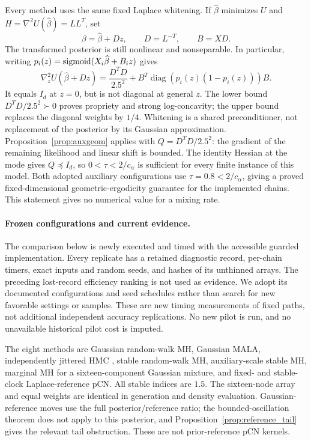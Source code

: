 \documentclass[pdflatex,iicol,sn-mathphys-ay]{sn-jnl}
\theoremstyle{definition}\newtheorem{definition}[theorem]{Definition}
\theoremstyle{remark}\newtheorem{remark}[theorem]{Remark}
\numberwithin{equation}{section}
\newcommand{\diag}{\operatorname{diag}}\newcommand{\SA}{\mathrm{S}\alpha\mathrm{S}}
\newcommand{\1}{\mathbf 1}
\begin{document}
Every method uses the same fixed Laplace whitening. If $\widehat\beta$ minimizes $U$ and $H=\nabla^2U(\widehat\beta)=LL^T$, set
\[
 \beta=\widehat\beta+Dz,\qquad D=L^{-T},\qquad B=XD.
\]
The transformed posterior is still nonlinear and nonseparable. In particular, writing $p_i(z)=\operatorname{sigmoid}(X_i\widehat\beta+B_iz)$ gives
\begin{equation}
 \nabla_z^2U(\widehat\beta+Dz)
 =\frac{D^TD}{2.5^2}+B^T\diag(p_i(z)(1-p_i(z)))B.
 \label{eq:logistichessian}
\end{equation}
It equals $I_d$ at $z=0$, but is not diagonal at general $z$. The lower bound $D^TD/2.5^2\succ0$ proves propriety and strong log-concavity; the upper bound replaces the diagonal weights by $1/4$. Whitening is a shared preconditioner, not replacement of the posterior by its Gaussian approximation. Proposition~\ref{prop:auxgeom} applies with $Q=D^TD/2.5^2$: the gradient of the remaining likelihood and linear shift is bounded. The identity Hessian at the mode gives $Q\preceq I_d$, so $0<\tau<2/c_\alpha$ is sufficient for every finite instance of this model. Both adopted auxiliary configurations use $\tau=0.8<2/c_\alpha$, giving a proved fixed-dimensional geometric-ergodicity guarantee for the implemented chains. This statement gives no numerical value for a mixing rate.

\paragraph{Frozen configurations and current evidence.}
The comparison below is newly executed and timed with the accessible guarded implementation. Every replicate has a retained diagnostic record, per-chain timers, exact inputs and random seeds, and hashes of its unthinned arrays. The preceding lost-record efficiency ranking is not used as evidence. We adopt its documented configurations and seed schedules rather than search for new favorable settings or samples. These are new timing measurements of fixed paths, not additional independent accuracy replications. No new pilot is run, and no unavailable historical pilot cost is imputed.

The eight methods are Gaussian random-walk MH, Gaussian MALA, independently jittered HMC \citep{neal}, stable random-walk MH, auxiliary-scale stable MH, marginal MH for a sixteen-component Gaussian mixture, and fixed- and stable-clock Laplace-reference pCN. All stable indices are $1.5$. The sixteen-node array and equal weights are identical in generation and density evaluation. Gaussian-reference moves use the full posterior/reference ratio; the bounded-oscillation theorem does not apply to this posterior, and Proposition~\ref{prop:reference_tail} gives the relevant tail obstruction. These are not prior-reference pCN kernels.
\end{document}
